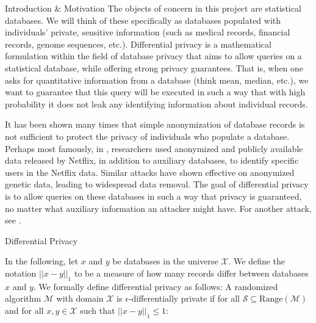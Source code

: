 \documentclass[final]{beamer}
\newlength{\onecolwid}
\begin{document}
\begin{frame}[t]
\begin{columns}[t]
\begin{column}{\onecolwid}
\begin{block}{Introduction \& Motivation}
The objects of concern in this project are statistical databases. We will think of these specifically as databases populated with individuals' private, sensitive information (such as medical records, financial records, genome sequences, etc.). Differential privacy is a mathematical formulation within the field of database privacy that aims to allow queries on a statistical database, while offering strong privacy guarantees. That is, when one asks for quantitative information from a database (think mean, median, etc.), we want to guarantee that this query will be executed in such a way that with high probability it does not leak any identifying information about individual records.



It has been shown many times that simple anonymization of database records is not sufficient to protect the privacy of individuals who populate a database. Perhaps most famously, in \cite{narayanan2008robust}, researchers used anonymized and publicly available data released by Netflix, in addition to auxiliary databases, to identify specific users in the Netflix data. Similar attacks have shown effective on anonymized genetic data, leading to widespread data removal. The goal of differential privacy is to allow queries on these databases in such a way that privacy is guaranteed, no matter what auxiliary information an attacker might have. For another attack, see \cite{homer2008resolving}.

\end{block}


\begin{block}{Differential Privacy}

In the following, let $x$ and $y$ be databases in the universe $\mathcal{X}$. We define the notation $||x-y||_1$ to be a measure of how many records differ between databases $x$ and $y$. We formally define differential privacy as follows:
A randomized algorithm $\mathcal{M}$ with domain $\mathcal{X}$ is $\epsilon$-differentially private if for all $\mathcal{S}\subseteq \text{Range}(\mathcal{M})$ and for all $x,y \in\mathcal{X}$ such that $||x - y||_1 \leq 1$:


\end{block}
\end{column}
\end{columns}
\end{frame}
\end{document}

